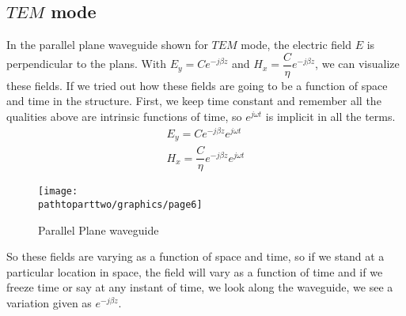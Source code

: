 \subsection{$TEM$ mode}
In the parallel plane waveguide shown for $TEM$ mode, the electric field $E$ is perpendicular to the plans. With ${E_y = Ce^{-j\beta z}}$ and ${H_x = \dfrac{C}{\eta}e^{-j\beta z}}$, we can visualize these fields. If we tried out how these fields are going to be a function of space and time in the structure. First, we keep time constant and remember all the qualities above are intrinsic functions of time, so ${e^{j\omega t}}$ is implicit in all the terms.
\begin{align*}
E_y = Ce^{-j\beta z}e^{j\omega t}\\
H_x = {\dfrac{C}{\eta}}e^{-j\beta z} e^{j\omega t}
\end{align*}
\begin{figure}[h]
\centering
\texttt{[image: \\pathtoparttwo/graphics/page6]}
\caption{Parallel Plane waveguide}
\label{fig:page6}
\end{figure}

So these fields are varying as a function of space and time, so if we stand at a particular location in space, the field will vary as a function of time and if we freeze time or say at any instant of time, we look along the waveguide, we see a variation given as $e^{-j\beta z}$. 

